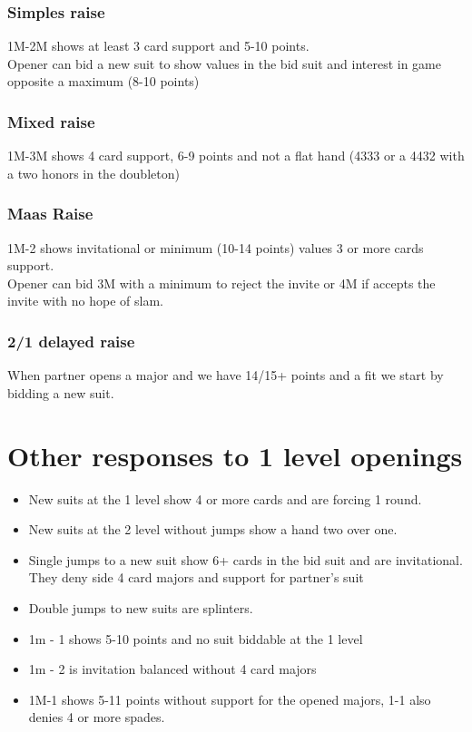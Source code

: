 \documentclass[11pt]{article}
\begin{document}
\subsubsection*{Simples raise}
\label{sec:org98289f4}
1M-2M shows at least 3 card support and 5-10 points. \\
Opener can bid a new suit to show values in the bid suit and interest in game opposite a maximum (8-10 points) 
\subsubsection*{Mixed raise}
\label{sec:orgcb5c9c0}
1M-3M shows 4 card support, 6-9 points and not a flat hand (4333 or a 4432 with a two honors in the doubleton) 
\subsubsection*{Maas Raise}
\label{sec:orgd4f034f}
1M-2 shows invitational or minimum (10-14 points) values 3 or more cards support. \\
Opener can bid 3M with a minimum to reject the invite or 4M if accepts the invite with no hope of slam. \\
\subsubsection*{2/1 delayed raise}
\label{sec:orgff4807d}
When partner opens a major and we have 14/15+ points and a fit we start by bidding a new suit. \\
\section*{Other responses to 1 level openings}
\label{sec:orgc81ad36}
\begin{itemize}
\item New suits at the 1 level show 4 or more cards and are forcing 1 round.
\item New suits at the 2 level without jumps show a hand two over one.
\item Single jumps to a new suit show 6+ cards in the bid suit and are invitational. They deny side 4 card majors and support for partner's suit
\item Double jumps to new suits are splinters.
\item 1m - 1 shows 5-10 points and no suit biddable at the 1 level
\item 1m - 2 is invitation balanced without 4 card majors
\item 1M-1 shows 5-11 points without support for the opened majors, 1-1 also denies 4 or more spades.
\end{itemize}
\end{document}
